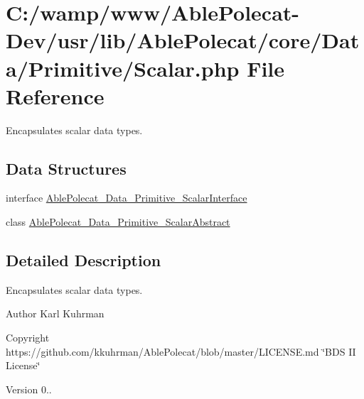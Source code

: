 \hypertarget{_scalar_8php}{}\section{C\+:/wamp/www/\+Able\+Polecat-\/\+Dev/usr/lib/\+Able\+Polecat/core/\+Data/\+Primitive/\+Scalar.php File Reference}
\label{_scalar_8php}


Encapsulates scalar data types.  


\subsection*{Data Structures}
\begin{DoxyCompactItemize}
\item 
interface \hyperlink{interface_able_polecat___data___primitive___scalar_interface}{Able\+Polecat\+\_\+\+Data\+\_\+\+Primitive\+\_\+\+Scalar\+Interface}
\item 
class \hyperlink{class_able_polecat___data___primitive___scalar_abstract}{Able\+Polecat\+\_\+\+Data\+\_\+\+Primitive\+\_\+\+Scalar\+Abstract}
\end{DoxyCompactItemize}


\subsection{Detailed Description}
Encapsulates scalar data types. 

\begin{DoxyAuthor}{Author}
Karl Kuhrman 
\end{DoxyAuthor}
\begin{DoxyCopyright}{Copyright}
https\+://github.com/kkuhrman/\+Able\+Polecat/blob/master/\+L\+I\+C\+E\+N\+S\+E.\+md \char`\"{}\+B\+D\+S I\+I License\char`\"{} 
\end{DoxyCopyright}
\begin{DoxyVersion}{Version}
0.. 
\end{DoxyVersion}
